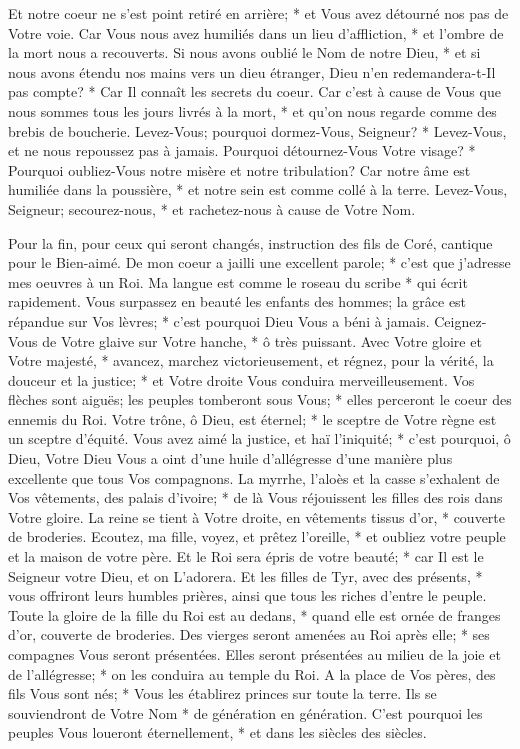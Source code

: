 Et notre coeur ne s'est point retiré en arrière; * et Vous avez détourné nos pas de Votre voie.
Car Vous nous avez humiliés dans un lieu d'affliction, * et l'ombre de la mort nous a recouverts.
Si nous avons oublié le Nom de notre Dieu, * et si nous avons étendu nos mains vers un dieu étranger,
Dieu n'en redemandera-t-Il pas compte? * Car Il connaît les secrets du coeur. Car c'est à cause de Vous que nous sommes tous les jours livrés à la mort, * et qu'on nous regarde comme des brebis de boucherie.
Levez-Vous; pourquoi dormez-Vous, Seigneur? * Levez-Vous, et ne nous repoussez pas à jamais.
Pourquoi détournez-Vous Votre visage? * Pourquoi oubliez-Vous notre misère et notre tribulation?
Car notre âme est humiliée dans la poussière, * et notre sein est comme collé à la terre.
Levez-Vous, Seigneur; secourez-nous, * et rachetez-nous à cause de Votre Nom.

Pour la fin, pour ceux qui seront changés, instruction des fils de Coré, cantique pour le Bien-aimé.
De mon coeur a jailli une excellent parole; * c'est que j'adresse mes oeuvres à un Roi. Ma langue est comme le roseau du scribe * qui écrit rapidement.
Vous surpassez en beauté les enfants des hommes; la grâce est répandue sur Vos lèvres; * c'est pourquoi Dieu Vous a béni à jamais.
Ceignez-Vous de Votre glaive sur Votre hanche, * ô très puissant.
Avec Votre gloire et Votre majesté, * avancez, marchez victorieusement, et régnez, pour la vérité, la douceur et la justice; * et Votre droite Vous conduira merveilleusement.
Vos flèches sont aiguës; les peuples tomberont sous Vous; * elles perceront le coeur des ennemis du Roi.
Votre trône, ô Dieu, est éternel; * le sceptre de Votre règne est un sceptre d'équité.
Vous avez aimé la justice, et haï l'iniquité; * c'est pourquoi, ô Dieu, Votre Dieu Vous a oint d'une huile d'allégresse d'une manière plus excellente que tous Vos compagnons.
La myrrhe, l'aloès et la casse s'exhalent de Vos vêtements, des palais d'ivoire; * de là Vous réjouissent
les filles des rois dans Votre gloire. La reine se tient à Votre droite, en vêtements tissus d'or, * couverte de broderies.
Ecoutez, ma fille, voyez, et prêtez l'oreille, * et oubliez votre peuple et la maison de votre père.
Et le Roi sera épris de votre beauté; * car Il est le Seigneur votre Dieu, et on L'adorera.
Et les filles de Tyr, avec des présents, * vous offriront leurs humbles prières, ainsi que tous les riches d'entre le peuple.
Toute la gloire de la fille du Roi est au dedans, * quand elle est ornée de franges d'or,
couverte de broderies. Des vierges seront amenées au Roi après elle; * ses compagnes Vous seront présentées.
Elles seront présentées au milieu de la joie et de l'allégresse; * on les conduira au temple du Roi.
A la place de Vos pères, des fils Vous sont nés; * Vous les établirez princes sur toute la terre.
Ils se souviendront de Votre Nom * de génération en génération. C'est pourquoi les peuples Vous loueront éternellement, * et dans les siècles des siècles.


